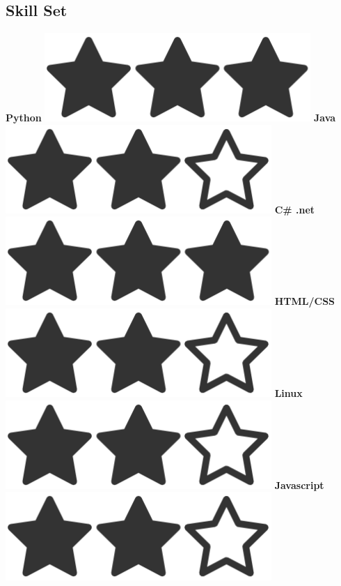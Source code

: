 \documentclass[]{friggeri-cv}
\begin{document}
\begin{aside}
  \section{Skill Set}
    \textbf{Python  }\includegraphics[scale=0.07]{img/3heart.png}
    \textbf{Java  }\includegraphics[scale=0.07]{img/2heart.png}
    \textbf{C\# .net  }\includegraphics[scale=0.07]{img/3heart.png}
    \textbf{HTML/CSS  }\includegraphics[scale=0.07]{img/2heart.png}
    \textbf{Linux  }\includegraphics[scale=0.07]{img/2heart.png}
    \textbf{Javascript  }\includegraphics[scale=0.07]{img/2heart.png}

\end{aside}
\end{document}
